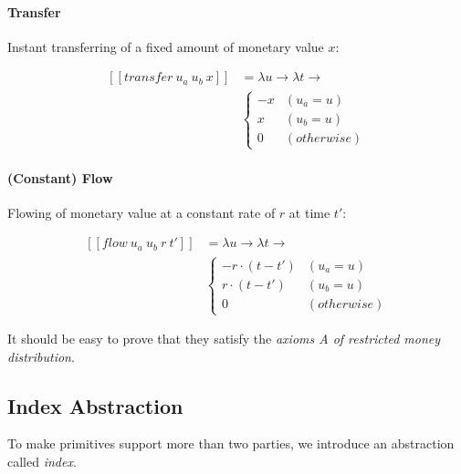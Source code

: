 \paragraph{Transfer}

Instant transferring of a fixed amount of monetary value $x$:

\begin{equation}
    \begin{split}
        [\![transfer\ u_a\ u_b\ x]\!] &=
        \lambda u \rightarrow \lambda t \rightarrow \\
        &\begin{cases}
            -x & (u_a = u) \\
             x & (u_b = u) \\
             0 & (otherwise)
        \end{cases}
    \end{split}
\end{equation}

\paragraph{(Constant) Flow}

Flowing of monetary value at a constant rate of $r$ at time $t'$:

\begin{equation}
    \begin{split}
        [\![flow\ u_a\ u_b\ r\ t']\!] &=
        \lambda u \rightarrow \lambda t \rightarrow \\
        &\begin{cases}
            -r \cdot (t - t') & (u_a = u) \\
             r \cdot (t - t') & (u_b = u) \\
                            0 & (otherwise)
        \end{cases}
    \end{split}
\end{equation}

It should be easy to prove that they satisfy the \textit{axioms A of restricted money distribution}.

\subsection{Index Abstraction}

To make primitives support more than two parties, we introduce an abstraction called \textit{index}.

